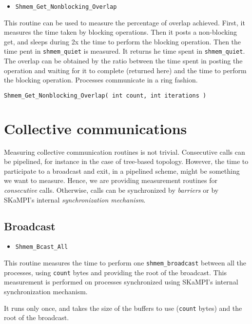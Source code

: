 \documentclass[12pt, letterpaper]{article}
\begin{document}
\begin{itemize}
    \item {\tt Shmem\_Get\_Nonblocking\_Overlap}
\end{itemize}

This routine can be used to measure the percentage of overlap achieved. First, it measures the time taken by blocking operations. Then it posts a non-blocking get, and sleeps during 2x the time to perform the blocking operation. Then the time pent in {\tt shmem\_quiet} is measured. It returns he time spent in {\tt shmem\_quiet}. The overlap can be obtained by the ratio between the time spent in posting the operation and waiting for it to complete (returned here) and the time to perform the blocking operation. Processes communicate in a ring fashion. 

\begin{lstlisting}
Shmem_Get_Nonblocking_Overlap( int count, int iterations )
\end{lstlisting}

\section{Collective communications}

Measuring collective communication routines is not trivial. Consecutive calls can be pipelined, for instance in the case of tree-based topology. However, the time to participate to a broadcast and exit, in a pipelined scheme, might be something we want to measure. Hence, we are providing measurement routines for \emph{consecutive} calls. Otherwise, calls can be synchronized by \emph{barriers} or by SKaMPI's internal \emph{synchronization mechanism}.

\subsection{Broadcast}

\begin{itemize}
    \item {\tt Shmem\_Bcast\_All}
\end{itemize}

 This routine measures the time to perform one {\tt shmem\_broadcast} between all the processes, using {\tt count} bytes and providing the root of the broadcast. This measurement is performed on processes synchronized using SKaMPI's internal synchronization mechanism.
 
 It runs only once, and takes the size of the buffers to use ({\tt count} bytes) and the root of the broadcast.
\end{document}
